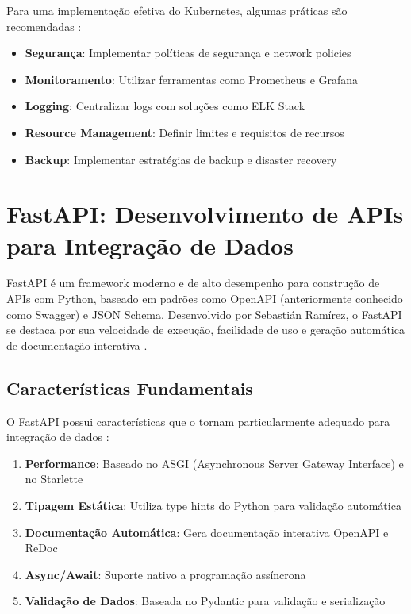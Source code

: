 Para uma implementação efetiva do Kubernetes, algumas práticas são recomendadas \cite{arundel2021kubernetes}:

\begin{itemize}
\item \textbf{Segurança}: Implementar políticas de segurança e network policies
\item \textbf{Monitoramento}: Utilizar ferramentas como Prometheus e Grafana
\item \textbf{Logging}: Centralizar logs com soluções como ELK Stack
\item \textbf{Resource Management}: Definir limites e requisitos de recursos
\item \textbf{Backup}: Implementar estratégias de backup e disaster recovery
\end{itemize}




\section{FastAPI: Desenvolvimento de APIs para Integração de Dados}

FastAPI é um framework moderno e de alto desempenho para construção de APIs com Python, baseado em padrões como OpenAPI (anteriormente conhecido como Swagger) e JSON Schema. Desenvolvido por Sebastián Ramírez, o FastAPI se destaca por sua velocidade de execução, facilidade de uso e geração automática de documentação interativa \cite{fastapi_foundation}.

\subsection{Características Fundamentais}

O FastAPI possui características que o tornam particularmente adequado para integração de dados \cite{ramirez2022fastapi}:

\begin{enumerate}
\item \textbf{Performance}: Baseado no ASGI (Asynchronous Server Gateway Interface) e no Starlette
\item \textbf{Tipagem Estática}: Utiliza type hints do Python para validação automática
\item \textbf{Documentação Automática}: Gera documentação interativa OpenAPI e ReDoc
\item \textbf{Async/Await}: Suporte nativo a programação assíncrona
\item \textbf{Validação de Dados}: Baseada no Pydantic para validação e serialização
\end{enumerate}

